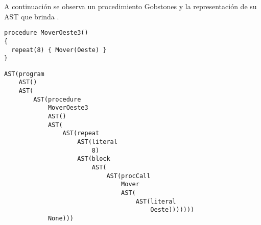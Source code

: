 \begin{appendices}
A continuación se observa un procedimiento Gobstones y la representación de su AST que brinda \pyGob.

\begin{verbatim}
procedure MoverOeste3()
{
  repeat(8) { Mover(Oeste) }
}
\end{verbatim}

\begin{verbatim}
AST(program
    AST()
    AST(
        AST(procedure
            MoverOeste3
            AST()
            AST(
                AST(repeat
                    AST(literal
                        8)
                    AST(block
                        AST(
                            AST(procCall
                                Mover
                                AST(
                                    AST(literal
                                        Oeste)))))))
            None)))
\end{verbatim}

\end{appendices}
